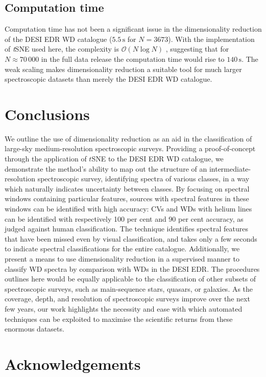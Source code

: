 \documentclass[fleqn,usenatbib]{mnras}
\begin{document}
\subsection{Computation time}

Computation time has not been a significant issue in the dimensionality reduction of the DESI EDR WD catalogue ($5.5\,\text{s}$ for $N=3673$).
With the implementation of \textit{t}SNE used here, the complexity is $\mathcal{O}(N\log N)$ \citep{barneshut, vandermaaten14}, suggesting that for $N\approx 70\,000$ in the full data release the computation time would rise to $140\,\text{s}$.
The weak scaling makes dimensionality reduction a suitable tool for much larger spectroscopic datasets than merely the DESI EDR WD catalogue.

\section{Conclusions}
\label{sec:conclusions}

We outline the use of dimensionality reduction as an aid in the classification of large-sky medium-resolution spectroscopic surveys.
Providing a proof-of-concept through the application of $t$SNE to the DESI EDR WD catalogue, we demonstrate the method's ability to map out the structure of an intermediate-resolution spectroscopic survey, identifying spectra of various classes, in a way which naturally indicates uncertainty between classes.
By focusing on spectral windows containing particular features, sources with spectral features in these windows can be identified with high accuracy: CVs and WDs with helium lines can be identified with respectively 100 per cent and 90 per cent accuracy, as judged against human classification.
The technique identifies spectral features that have been missed even by visual classification, and takes only a few seconds to indicate spectral classifications for the entire catalogue.
Additionally, we present a means to use dimensionality reduction in a supervised manner to classify WD spectra by comparison with WDs in the DESI EDR.
The procedures outlines here would be equally applicable to the classification of other subsets of spectroscopic surveys, such as main-sequence stars, quasars, or galaxies.
As the coverage, depth, and resolution of spectroscopic surveys improve over the next few years, our work highlights the necessity and ease with which automated techniques can be exploited to maximise the scientific returns from these enormous datasets.

\section*{Acknowledgements}
\end{document}
